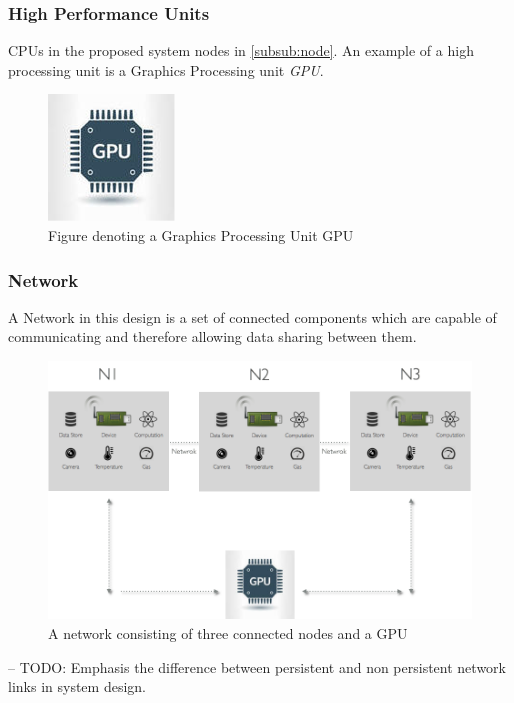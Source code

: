 \subsubsection{High Performance  Units }

CPUs in the proposed system nodes in \ref{subsub:node}. An example of a high processing unit is  a Graphics Processing unit \textit{GPU}.

\begin{figure}[H]
	\centering
	\includegraphics[scale=0.7]{images/gpu.png}
		\caption{Figure denoting a Graphics Processing Unit GPU}
	\label{fig:gpu}
\end{figure}

\subsubsection{Network}
\label{subsub:network}
A Network in this design is a set of connected components which are capable of communicating and therefore allowing data sharing between them.
\begin{figure}[H]
	\centering
	\includegraphics[scale=0.4]{images/network.png}
	\caption{A network consisting of three connected nodes and a GPU}
	\label{fig:network}
\end{figure}
-- TODO: 
Emphasis the difference between persistent and non persistent network links in system design.


